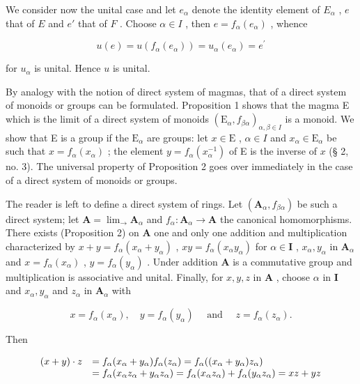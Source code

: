 We consider now the unital case and let \(e_{\alpha}\) denote the identity element of \(E_{\alpha}\) , \(e\) that of \(E\) and \(e'\) that of \(F\) . Choose \(\alpha \in I\) , then \(e = f_{\alpha}(e_{\alpha})\) , whence

\[
u (e) = u \left(f _ {\alpha} \left(e _ {\alpha}\right)\right) = u _ {\alpha} \left(e _ {\alpha}\right) = e ^ {\prime}
\]

for \(u_{\alpha}\) is unital. Hence \(u\) is unital.

By analogy with the notion of direct system of magmas, that of a direct system of monoids or groups can be formulated. Proposition 1 shows that the magma E which is the limit of a direct system of monoids \((\mathrm{E}_{\alpha}, f_{\beta \alpha})_{\alpha, \beta \in I}\) is a monoid. We show that E is a group if the \(\mathrm{E}_{\alpha}\) are groups: let \(x \in \mathrm{E}\) , \(\alpha \in I\) and \(x_{\alpha} \in \mathrm{E}_{\alpha}\) be such that \(x = f_{\alpha}(x_{\alpha})\) ; the element \(y = f_{\alpha}(x_{\alpha}^{-1})\) of E is the inverse of \(x\) (§ 2, no. 3). The universal property of Proposition 2 goes over immediately in the case of a direct system of monoids or groups.

The reader is left to define a direct system of rings. Let \((\mathbf{A}_{\alpha}, f_{\beta \alpha})\) be such a direct system; let \(\mathbf{A} = \lim_{\longrightarrow} \mathbf{A}_{\alpha}\) and \(f_{\alpha}: \mathbf{A}_{\alpha} \to \mathbf{A}\) the canonical homomorphisms. There exists (Proposition 2) on \(\mathbf{A}\) one and only one addition and multiplication characterized by \(x + y = f_{\alpha}(x_{\alpha} + y_{\alpha})\) , \(xy = f_{\alpha}(x_{\alpha}y_{\alpha})\) for \(\alpha \in \mathbf{I}\) , \(x_{\alpha}, y_{\alpha}\) in \(\mathbf{A}_{\alpha}\) and \(x = f_{\alpha}(x_{\alpha})\) , \(y = f_{\alpha}(y_{\alpha})\) . Under addition \(\mathbf{A}\) is a commutative group and multiplication is associative and unital. Finally, for \(x, y, z\) in \(\mathbf{A}\) , choose \(\alpha\) in \(\mathbf{I}\) and \(x_{\alpha}, y_{\alpha}\) and \(z_{\alpha}\) in \(\mathbf{A}_{\alpha}\) with

\[
x = f _ {\alpha} (x _ {\alpha}), \quad y = f _ {\alpha} (y _ {\alpha}) \quad \text { and } \quad z = f _ {\alpha} (z _ {\alpha}).
\]

Then

\[
\begin{array}{r l} (x + y) \cdot z & = f _ {\alpha} (x _ {\alpha} + y _ {\alpha}) f _ {\alpha} (z _ {\alpha}) = f _ {\alpha} ((x _ {\alpha} + y _ {\alpha}) z _ {\alpha}) \\ & = f _ {\alpha} (x _ {\alpha} z _ {\alpha} + y _ {\alpha} z _ {\alpha}) = f _ {\alpha} (x _ {\alpha} z _ {\alpha}) + f _ {\alpha} (y _ {\alpha} z _ {\alpha}) = x z + y z \end{array}
\]


